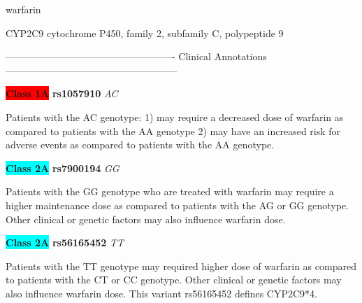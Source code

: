 \documentclass{resume} %
\begin{document}
\begin{rSection}{ warfarin }
\begin{rSubsection}{ CYP2C9 }{ cytochrome P450, family 2, subfamily C, polypeptide 9 }{}{}
\item[] ---------------------------------------------------- Clinical Annotations -----------------------------------------------------\newline
\item \textbf{\colorbox{red} {Class 1A}} \textbf{ rs1057910 } \textit{ AC }
\item[] Patients with the AC genotype: 1) may require a decreased dose of warfarin as compared to patients with the AA genotype 2) may have an increased risk for adverse events as compared to patients with the AA genotype.\item \textbf{\colorbox{cyan} {Class 2A}} \textbf{ rs7900194 } \textit{ GG }
\item[] Patients with the GG genotype who are treated with warfarin may require a higher maintenance dose as compared to patients with the AG or GG genotype.  Other clinical or genetic factors may also influence warfarin dose.\item \textbf{\colorbox{cyan} {Class 2A}} \textbf{ rs56165452 } \textit{ TT }
\item[] Patients with the TT genotype may required higher dose of warfarin as compared to patients with the CT or CC genotype. Other clinical or genetic factors may also influence  warfarin dose. This variant rs56165452 defines CYP2C9*4.


\end{rSubsection}
\end{rSection}
\end{document}
